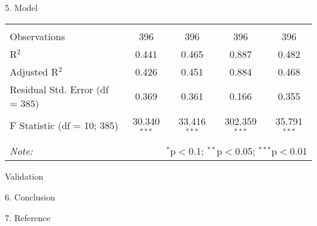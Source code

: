 \documentclass[
  ignorenonframetext,
]{beamer}
\begin{document}
\begin{frame}{5. Model}
\begin{table}[H]
\begin{tabular}{@{\extracolsep{5pt}}lcccc}
 \hline \\[-1.8ex] 
Observations & 396 & 396 & 396 & 396 \\ 
R$^{2}$ & 0.441 & 0.465 & 0.887 & 0.482 \\ 
Adjusted R$^{2}$ & 0.426 & 0.451 & 0.884 & 0.468 \\ 
Residual Std. Error (df = 385) & 0.369 & 0.361 & 0.166 & 0.355 \\ 
F Statistic (df = 10; 385) & 30.340$^{***}$ & 33.416$^{***}$ & 302.359$^{***}$ & 35.791$^{***}$ \\ 
\hline 
\hline \\[-1.8ex] 
\textit{Note:}  & \multicolumn{4}{r}{$^{*}$p$<$0.1; $^{**}$p$<$0.05; $^{***}$p$<$0.01} \\ 
\end{tabular} 
\end{table}

\begin{block}{Validation}
\protect\hypertarget{validation}{}
\end{block}
\end{frame}

\begin{frame}{6. Conclusion}
\protect\hypertarget{conclusion}{}
\end{frame}

\begin{frame}{7. Reference}
\protect\hypertarget{reference}{}
\end{frame}
\end{document}
